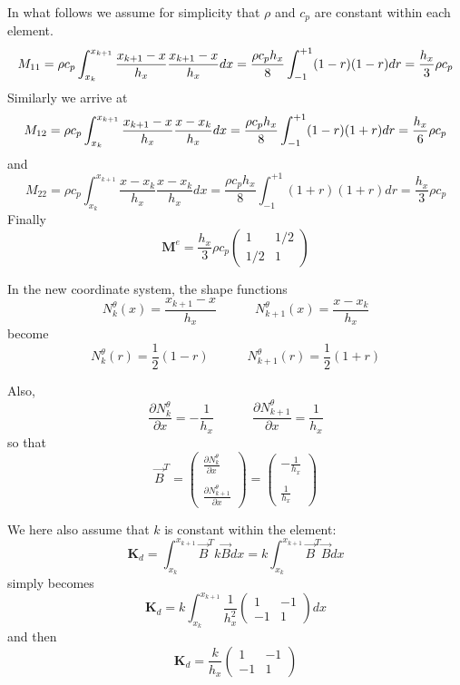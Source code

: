 In what follows we assume for simplicity that $\rho$ and $c_p$ are constant within each element.
\[
M_{11}=
\rho c_p
\int_{\tiny x_k}^{x_{k+1}} 
\frac{x_{k+1}-x}{h_x}  
\frac{x_{k+1}-x}{h_x}  
dx
=  \frac{\rho c_p h_x}{8} \int_{-1}^{+1} (1-r) (1-r)  dr  = \frac{h_x}{3} \rho c_p
\]
Similarly we arrive at 
\begin{eqnarray}
M_{12}
=\rho c_p 
\int_{x_k}^{x_{k+1}} 
\frac{x_{k+1}-x}{h_x}  
\frac{x-x_k}{h_x}  
dx
=
\frac{\rho c_p  h_x}{8} 
\int_{-1}^{+1} (1-r) (1+r)dr
= \frac{h_x}{6} \rho c_p \nonumber
\end{eqnarray}
and 
\[
M_{22}
=
\rho c_p 
\int_{x_k}^{x_{k+1}} 
\frac{x-x_k}{h_x}  
\frac{x-x_k}{h_x}  
dx
=
\frac{\rho c_p  h_x}{8} 
\int_{-1}^{+1} (1+r) (1+r)dr
= \frac{h_x}{3} \rho c_p 
\]
Finally 
\[
\boxed{
{\bm M}^e= \frac{h_x}{3} \rho c_p  
\left(
\begin{array}{cc}
1  & 1/2 \\
1/2 & 1
\end{array}
\right)
}
\]

In the new coordinate system, the {\color{olive}shape functions} 
\[
N_k^\theta(x) = \frac{x_{k+1}-x}{h_x} 
\quad
\quad
\quad
N_{k+1}^\theta(x) = \frac{x-x_k}{h_x} 
\]
become 
\[
N_k^\theta(r) = \frac{1}{2} (1-r)
\quad
\quad
\quad
N_{k+1}^\theta(r) = \frac{1}{2} (1+r)
\]

Also, 
\[
\frac{\partial N_k^\theta}{\partial x} = - \frac{1}{h_x} 
\quad
\quad
\quad
\frac{\partial N_{k+1}^\theta}{\partial x} = \frac{1}{h_x} 
\]
so that 
\[
{\vec B}^T=
\left(
\begin{array}{cc}
 \frac{\partial N_k^\theta}{\partial x}   \\ \\
 \frac{\partial N_{k+1}^\theta}{\partial x}
\end{array}
\right)
=
\left(
\begin{array}{cc}
-\frac{1}{h_x} \\ \\
\frac{1}{h_x} 
\end{array}
\right)
\]


We here also assume that $k$ is constant within the element:
\[
{\bm K}_d =
\int_{x_k}^{x_{k+1}}   {\vec B}^T k {\vec B} dx 
= k \int_{x_k}^{x_{k+1}}   {\vec B}^T {\vec B} dx 
\]
simply becomes
\[
{\bm K}_d = k
 \int_{x_k}^{x_{k+1}} 
\frac{1}{h_x^2}
\left(
\begin{array}{cc}
1 & -1 \\ -1 & 1
\end{array}
\right)
dx
\]
and then
\[
\boxed{
{\bm K}_d =
\frac{k}{h_x}
\left(
\begin{array}{cc}
1 & -1 \\ -1 & 1
\end{array}
\right)
}
\]

